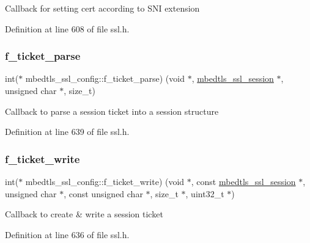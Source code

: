 Callback for setting cert according to S\+NI extension 

Definition at line 608 of file ssl.\+h.

\mbox{\label{structmbedtls__ssl__config_a9847915b60397ff205544b6f7d2ad5ff}} 
\subsubsection{\texorpdfstring{f\+\_\+ticket\+\_\+parse}{f\_ticket\_parse}}
{\footnotesize\ttfamily int($\ast$ mbedtls\+\_\+ssl\+\_\+config\+::f\+\_\+ticket\+\_\+parse) (void $\ast$, \mbox{\hyperlink{structmbedtls__ssl__session}{mbedtls\+\_\+ssl\+\_\+session}} $\ast$, unsigned char $\ast$, size\+\_\+t)}

Callback to parse a session ticket into a session structure 

Definition at line 639 of file ssl.\+h.

\mbox{\label{structmbedtls__ssl__config_a4506906963c41fa4602d4959b88c7ebe}} 
\subsubsection{\texorpdfstring{f\+\_\+ticket\+\_\+write}{f\_ticket\_write}}
{\footnotesize\ttfamily int($\ast$ mbedtls\+\_\+ssl\+\_\+config\+::f\+\_\+ticket\+\_\+write) (void $\ast$, const \mbox{\hyperlink{structmbedtls__ssl__session}{mbedtls\+\_\+ssl\+\_\+session}} $\ast$, unsigned char $\ast$, const unsigned char $\ast$, size\+\_\+t $\ast$, uint32\+\_\+t $\ast$)}

Callback to create \& write a session ticket 

Definition at line 636 of file ssl.\+h.

\mbox{\label{structmbedtls__ssl__config_ab79f1ffbe0f2ee8519f22fd6611dbb63}} 
